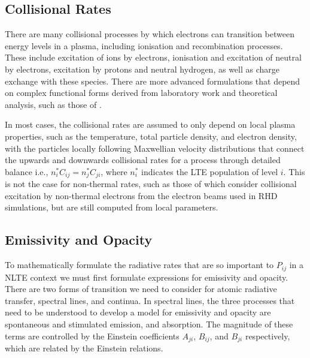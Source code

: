 \subsection{Collisional Rates}

There are many collisional processes by which electrons can transition between energy levels in a plasma, including ionisation and recombination processes.
These include excitation of ions by electrons, ionisation and excitation of neutral by electrons, excitation by protons and neutral hydrogen, as well as charge exchange with these species.
There are more advanced formulations that depend on complex functional forms derived from laboratory work and theoretical analysis, such as those of \citet{Burgess1983, Arnaud1985}.

In most cases, the collisional rates are assumed to only depend on local plasma properties, such as the temperature, total particle density, and electron density, with the particles locally following Maxwellian velocity distributions that connect the upwards and downwards collisional rates for a process through detailed balance i.e., $n_i^* C_{ij} = n_j^* C_{ji}$, where $n_i^*$ indicates the LTE population of level $i$.
This is not the case for non-thermal rates, such as those of \citet{1993Fang} which consider collisional excitation by non-thermal electrons from the electron beams used in RHD simulations, but are still computed from local parameters.

\subsection{Emissivity and Opacity}

To mathematically formulate the radiative rates that are so important to $P_{ij}$ in a NLTE context we must first formulate expressions for emissivity and opacity.
There are two forms of transition we need to consider for atomic radiative transfer, spectral lines, and continua.
In spectral lines, the three processes that need to be understood to develop a model for emissivity and opacity are spontaneous and stimulated emission, and absorption.
The magnitude of these terms are controlled by the Einstein coefficients $A_{ji}$, $B_{ij}$, and $B_{ji}$ respectively, which are related by the Einstein relations.


